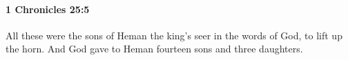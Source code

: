 
		\paragraph{1 Chronicles 25:5} %
			\label{1CHRONICLES-25-5}

			All these were the sons of Heman the king’s seer in the words of God, to lift up the horn. And God gave to Heman fourteen sons and three daughters.


